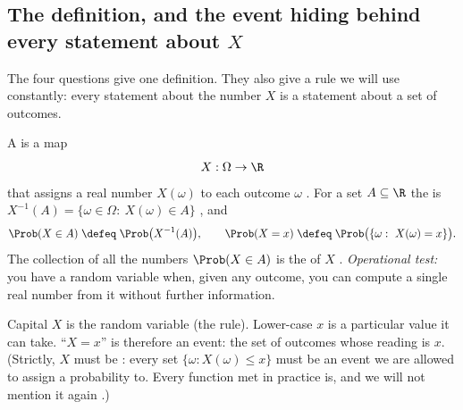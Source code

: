 \subsection{The definition, and the event hiding behind every statement about \texorpdfstring{$X$}{X}}

The four questions give one definition. They also give a rule we will use
constantly: every statement about the number $X$ is a statement about a set
of outcomes.

\begin{workdef}
A  is a map
\[
  X:\Omega\to\R
\]
that assigns a real number $X(\omega)$ to each outcome $\omega$
. For a set $A\subseteq\R$ the  is
$X^{-1}(A)=\{\omega\in\Omega:\ X(\omega)\in A\}$ , and
\[
  \Prob(X\in A)\;\defeq\;\Prob\bigl(X^{-1}(A)\bigr),\qquad
  \Prob(X=x)\;\defeq\;\Prob\bigl(\{\omega:\ X(\omega)=x\}\bigr).
\]
The collection of all the numbers $\Prob(X\in A)$ is the
 of $X$ .
\emph{Operational test:} you have a random variable when, given any outcome,
you can compute a single real number from it without further information.
\end{workdef}

Capital $X$ is the random variable (the rule). Lower-case $x$ is a particular
value it can take. ``$X=x$'' is therefore an event: the set of outcomes whose
reading is $x$. (Strictly, $X$ must be : every set
$\{\omega:X(\omega)\le x\}$ must be an event we are allowed to assign a
probability to. Every function met in practice is, and we will not mention it
again .)


